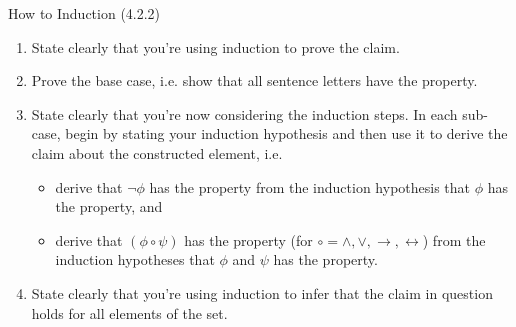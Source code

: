 \begin{frame}{How to Induction (4.2.2)}

	\begin{enumerate}[1.]
		
			\item State clearly that you're using induction to prove the claim.
			
			\item Prove the base case, i.e. show that all sentence letters have the property.
			
			\item State clearly that you're now considering the induction steps. In each sub-case, begin by stating your induction hypothesis and then use it to derive the claim about the constructed element, i.e.
			\begin{itemize}
			
				\item derive that $\neg\phi$ has the property from the induction hypothesis that $\phi$ has the property, and
				
				\item derive that $(\phi\circ\psi)$ has the property (for $\circ=\land,\lor,\to,\leftrightarrow$) from the induction hypotheses that $\phi$ and $\psi$ has the property.
			
			\end{itemize}
			
			\item State clearly that you're using induction to infer that the claim in question holds for all elements of the set.
		
		\end{enumerate}

\end{frame}		

